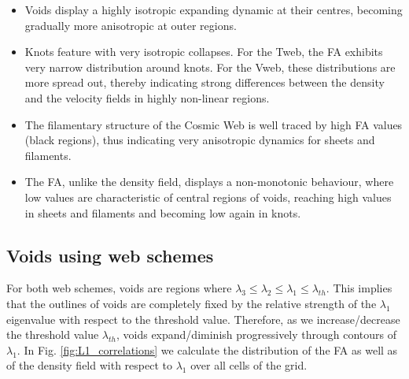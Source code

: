 \documentclass[a4,useAMS,usenatbib,usegraphicx]{latex/mn2e}
\begin{document}
\begin{itemize}
\item Voids display a highly isotropic expanding dynamic at their centres, 
becoming gradually more anisotropic at outer regions.
\item Knots feature with very isotropic collapses. For the Tweb, the FA 
exhibits very narrow distribution around knots. For the Vweb, these
distributions are more spread out, thereby indicating strong differences 
between the density and the velocity fields in highly non-linear regions.
\item The filamentary structure of the Cosmic Web is well traced by high 
FA values (black regions), thus indicating very anisotropic dynamics for 
sheets and filaments.
\item The FA, unlike the density field, displays a non-monotonic behaviour, 
where low values are characteristic of central regions of voids, reaching 
high values in sheets and filaments and becoming low again in knots. 
\end{itemize}


\subsection{Voids using web schemes}
\label{subsec:web_voids}


For both web schemes, voids are regions where $\lambda_3\leq\lambda_2\leq
\lambda_1\leq\lambda_{th}$. This implies that the outlines of voids
are completely fixed by the relative strength of the $\lambda_1$ 
eigenvalue with respect to the threshold value. Therefore, as we 
increase/decrease the threshold value $\lambda_{th}$, voids expand/diminish
progressively through contours of $\lambda_1$. In Fig. 
\ref{fig:L1_correlations} we calculate the distribution of the FA as well
as of the density field with respect to $\lambda_1$ over all cells of the 
grid.
\end{document}
